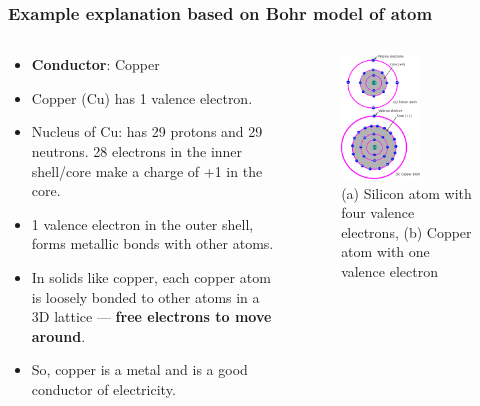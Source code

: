 \begin{frame}
	\frametitle{Example explanation based on Bohr model of atom}
	\begin{columns}
		\begin{column}{0.6\textwidth}
            \begin{itemize}
                \item \textbf{Conductor}: Copper
                \item Copper (Cu) has 1 valence electron.  
                \item Nucleus of Cu: has 29 protons and 29 neutrons. 28 electrons in the inner shell/core make a charge of +1 in the core.
                \item 1 valence electron in the outer shell, forms metallic bonds with other atoms.
                \item In solids like copper, each copper atom is loosely bonded to other atoms in a 3D lattice — \textbf{free electrons to move around}.
                \item So, copper is a metal and is a good conductor of electricity.
            \end{itemize}
		\end{column}
        \hfill
		\begin{column}{0.4\textwidth}
            \begin{figure}
                \centering
                \includegraphics[width=0.6\textwidth]{fig/lec02/Cu_Si_atom.pdf}
                \caption{(a) Silicon atom with four valence electrons, (b) Copper atom with one valence electron}
            \end{figure}
		\end{column}
		\end{columns}
\end{frame}

